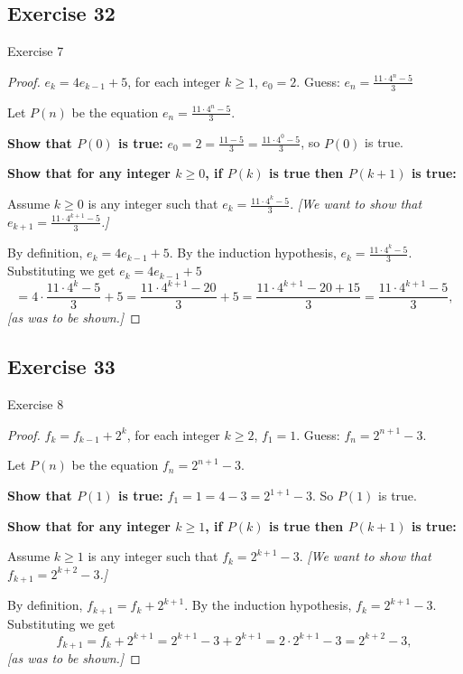 \documentclass[14pt]{extarticle}
\newcommand{\dps}{\displaystyle}
\begin{document}
\subsection{Exercise 32}
Exercise 7

\begin{proof}
    \(e_k = 4e_{k-1} + 5\), for each integer \(k \geq 1\), \(e_0 = 2\).
    Guess: \(\dps e_n = \frac{11 \cdot 4^n - 5}{3}\)

    Let $P(n)$ be the equation \(\dps e_n = \frac{11 \cdot 4^n - 5}{3}\).

        {\bf Show that \(P(0)\) is true:} \(e_0 = 2 = \frac{11 - 5}{3} = \frac{11 \cdot 4^0 - 5}{3}\), so $P(0)$ is true.

        {\bf Show that for any integer \(k \geq 0\), if \(P(k)\) is true then \(P(k+1)\) is true:}

    Assume \(k \geq 0\) is any integer such that \(\dps e_k = \frac{11 \cdot 4^k - 5}{3}\).
        {\it [We want to show that \(\dps e_{k+1} = \frac{11 \cdot 4^{k+1} - 5}{3}\).]}

    By definition, \(e_k = 4e_{k-1} + 5\).
    By the induction hypothesis, \(\dps e_k = \frac{11 \cdot 4^k - 5}{3}\).
    Substituting we get \(e_k = 4e_{k-1} + 5\)
    \[
        = 4 \cdot \frac{11 \cdot 4^k - 5}{3} + 5 = \frac{11 \cdot 4^{k+1} - 20}{3} + 5 =
        \frac{11 \cdot 4^{k+1} - 20 + 15}{3} = \frac{11 \cdot 4^{k+1} - 5}{3},
    \]
    {\it [as was to be shown.]}
\end{proof}

\subsection{Exercise 33}
Exercise 8

\begin{proof}
    \(f_k = f_{k-1} + 2^k\), for each integer \(k \geq 2\), \(f_1 = 1\). Guess: \(f_n = 2^{n+1} - 3\).

    Let $P(n)$ be the equation \(f_n = 2^{n+1} - 3\).

        {\bf Show that \(P(1)\) is true:} \(f_1 = 1 = 4 - 3 = 2^{1+1} - 3\). So $P(1)$ is true.

        {\bf Show that for any integer \(k \geq 1\), if \(P(k)\) is true then \(P(k+1)\) is true:}

    Assume \(k \geq 1\) is any integer such that \(f_k = 2^{k+1} - 3\).
        {\it [We want to show that \(f_{k+1} = 2^{k+2} - 3\).]}

    By definition, \(f_{k+1} = f_k + 2^{k+1}\).
    By the induction hypothesis, \(f_k = 2^{k+1} - 3\).
    Substituting we get
    \[
        f_{k+1} = f_k + 2^{k+1} = 2^{k+1} - 3 + 2^{k+1} = 2 \cdot 2^{k+1} - 3 = 2^{k+2} - 3,
    \]
    {\it [as was to be shown.]}
\end{proof}
\end{document}
